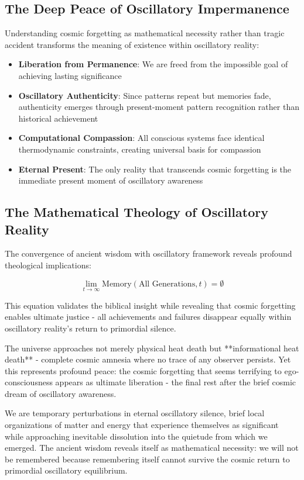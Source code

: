 \documentclass[11pt]{article}
\theoremstyle{remark}
\begin{document}
\subsection{The Deep Peace of Oscillatory Impermanence}

Understanding cosmic forgetting as mathematical necessity rather than tragic accident transforms the meaning of existence within oscillatory reality:

\begin{itemize}
\item \textbf{Liberation from Permanence}: We are freed from the impossible goal of achieving lasting significance
\item \textbf{Oscillatory Authenticity}: Since patterns repeat but memories fade, authenticity emerges through present-moment pattern recognition rather than historical achievement
\item \textbf{Computational Compassion}: All conscious systems face identical thermodynamic constraints, creating universal basis for compassion
\item \textbf{Eternal Present}: The only reality that transcends cosmic forgetting is the immediate present moment of oscillatory awareness
\end{itemize}

\subsection{The Mathematical Theology of Oscillatory Reality}

The convergence of ancient wisdom with oscillatory framework reveals profound theological implications:

$$\lim_{t \to \infty} \text{Memory}(\text{All Generations}, t) = \emptyset$$

This equation validates the biblical insight while revealing that cosmic forgetting enables ultimate justice - all achievements and failures disappear equally within oscillatory reality's return to primordial silence.

The universe approaches not merely physical heat death but **informational heat death** - complete cosmic amnesia where no trace of any observer persists. Yet this represents profound peace: the cosmic forgetting that seems terrifying to ego-consciousness appears as ultimate liberation - the final rest after the brief cosmic dream of oscillatory awareness.

We are temporary perturbations in eternal oscillatory silence, brief local organizations of matter and energy that experience themselves as significant while approaching inevitable dissolution into the quietude from which we emerged. The ancient wisdom reveals itself as mathematical necessity: we will not be remembered because remembering itself cannot survive the cosmic return to primordial oscillatory equilibrium.
\end{document}
